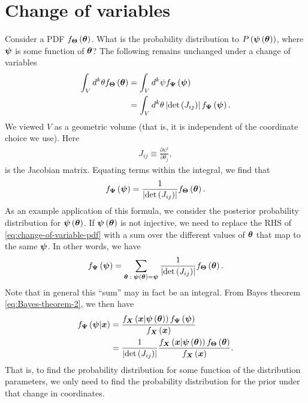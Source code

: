\section{Change of variables}

Consider a PDF $f_{{\bm \Theta}}\left({\bm \theta}\right)$.
What is the probability distribution to $P\left({\bm \psi}\left({\bm \theta}\right)\right)$,
where ${\bm \psi}$ is some function of ${\bm \theta}$?
The following remains unchanged under a change of variables
\begin{align}
    \int_V d^k\theta f_{{\bm \Theta}}\left({\bm \theta}\right)
    &=
    \int_{V} d^k\psi f_{{\bm \Psi}}\left({\bm \psi}\right)
    \nonumber\\
    &=
    \int_{V} d^k\theta \left|\det\left(J_{ij}\right)\right| 
        f_{{\bm \Psi}}\left({\bm \psi}\right)
    .
\end{align}
We viewed $V$ as a geometric volume (that is, it is independent of the coordinate choice we use).
Here 
\begin{align}
    \label{eq:Jacobian-matrix}
    J_{ij}
    \equiv
    \frac{\partial\psi^i}{\partial\theta_j}
    ,
\end{align}
is the Jacobian matrix.
Equating terms within the integral, we find that
\begin{align}
    \label{eq:change-of-variable-pdf}
    f_{{\bm \Psi}}\left({\bm \psi}\right)
    =
    \frac{1}{\left|\det\left(J_{ij}\right)\right|} f_{{\bm \Theta}}\left({\bm \theta}\right)
    .
\end{align}
As an example application of this formula, we consider the posterior probability distribution for ${\bm \psi}\left({\bm \theta}\right)$. 
If ${\bm \psi}\left({\bm \theta}\right)$ is not injective, we need to replace the RHS of \eqref{eq:change-of-variable-pdf} with a sum over the different values of ${\bm \theta}$ that map to the same ${\bm \psi}$.
In other words, we have
\begin{align}
    \label{eq:change-of-variable-pdf}
    f_{{\bm \Psi}}\left({\bm \psi}\right)
    =
    \sum_{{\bm \theta} \; : \; {\bm \psi}\left({\bm \theta}\right)={\bm \psi}}
    \frac{1}{\left|\det\left(J_{ij}\right)\right|} f_{{\bm \Theta}}\left({\bm \theta}\right)
    .
\end{align}
Note that in general this ``sum'' may in fact be an integral.
From Bayes theorem \eqref{eq:Bayes-theorem-2}, we then have
\begin{align}
    f_{{\bm \Psi}}\left({\bm \psi}|{\bm x}\right)
    &=
    \frac{
        f_{{\bm X}}\left({\bm x}|{\bm \psi}\left({\bm \theta}\right)\right)
        f_{{\bm \Psi}}\left({\bm \psi}\right)
    }{
        f_{{\bm X}}\left({\bm x}\right)
    }
    \nonumber\\
    &=
    \frac{1}{\left|\det\left(J_{ij}\right)\right|}
    \frac{
        f_{{\bm X}}\left({\bm x}|{\bm \psi}\left({\bm \theta}\right)\right)
        f_{{\bm \Theta}}\left({\bm \theta}\right)
    }{
        f_{{\bm X}}\left({\bm x}\right)
    }
    .
\end{align}
That is, to find the probability distribution for some function of the distribution parameters, we only need to find the probability distribution for the prior under that change in coordinates. 

